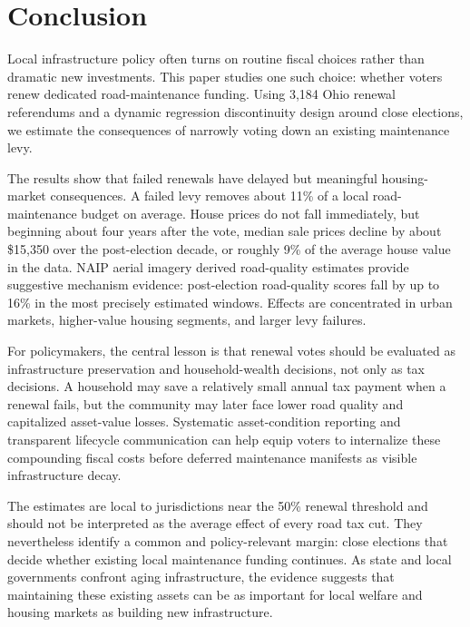 \section{Conclusion} \label{sec:conclusion}

Local infrastructure policy often turns on routine fiscal choices rather than dramatic new investments. This paper studies one such choice: whether voters renew dedicated road-maintenance funding. Using 3,184 Ohio renewal referendums and a dynamic regression discontinuity design around close elections, we estimate the consequences of narrowly voting down an existing maintenance levy.

The results show that failed renewals have delayed but meaningful housing-market consequences. A failed levy removes about 11\% of a local road-maintenance budget on average. House prices do not fall immediately, but beginning about four years after the vote, median sale prices decline by about \$15,350 over the post-election decade, or roughly 9\% of the average house value in the data. NAIP aerial imagery derived road-quality estimates provide suggestive mechanism evidence: post-election road-quality scores fall by up to 16\% in the most precisely estimated windows. Effects are concentrated in urban markets, higher-value housing segments, and larger levy failures.

For policymakers, the central lesson is that renewal votes should be evaluated as infrastructure preservation and household-wealth decisions, not only as tax decisions. A household may save a relatively small annual tax payment when a renewal fails, but the community may later face lower road quality and capitalized asset-value losses. Systematic asset-condition reporting and transparent lifecycle communication can help equip voters to internalize these compounding fiscal costs before deferred maintenance manifests as visible infrastructure decay.

The estimates are local to jurisdictions near the 50\% renewal threshold and should not be interpreted as the average effect of every road tax cut. They nevertheless identify a common and policy-relevant margin: close elections that decide whether existing local maintenance funding continues. 
As state and local governments confront aging infrastructure, the evidence suggests that maintaining these existing assets can be as important for local welfare and housing markets as building new infrastructure.

